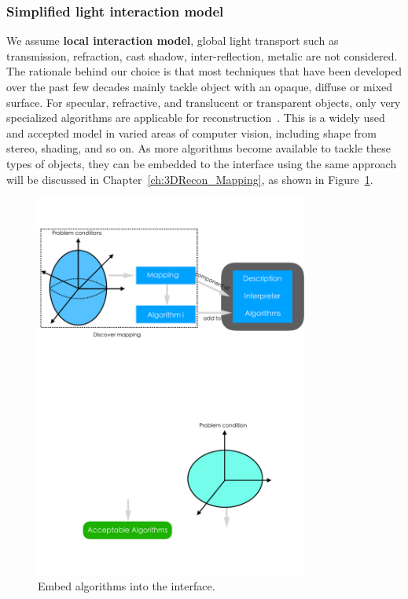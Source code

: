 \subsubsection{Simplified light interaction model}
We assume \textbf{local interaction model}, \ie global light transport such as transmission, refraction, cast shadow, inter-reflection, metalic are not considered. The rationale behind our choice is that most techniques that have been developed over the past few decades mainly tackle object with an opaque, diffuse or mixed surface. For specular, refractive, and translucent or transparent objects, only very specialized algorithms are applicable for reconstruction~\cite{ihrke2010transparent}. This is a widely used and accepted model in varied areas of computer vision, including shape from stereo, shading, and so on. As more algorithms become available to tackle these types of objects, they can be embedded to the interface using the same approach will be discussed in Chapter~\ref{ch:3DRecon_Mapping}, as shown in Figure~\ref{fig:embed_algo}.
\begin{figure}[!htbp]
\centering
\includegraphics[width=0.8\textwidth]{img/prob_space/embed_algo.pdf}
\caption{Embed algorithms into the interface.}
\label{fig:embed_algo}
\end{figure}

